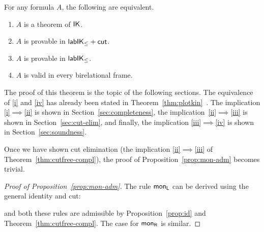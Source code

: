 \begin{theorem}\label{thm:cutfree-compl}
	For any formula $A$, the following are equivalent.
	\begin{enumerate}
		\item\label{i} $A$ is a theorem of $\mathsf{IK}$. 
		\item\label{ii} $A$ is provable in $\mathsf{lab}\mathsf{IK}_{\le} +\mathsf{cut}_{}$.
		\item\label{iii} $A$ is provable in $\mathsf{lab}\mathsf{IK}_{\le}$.
		\item\label{iv} $A$ is valid in every birelational frame. %
	\end{enumerate}
\end{theorem}

The proof of this theorem is the topic of the following sections. The
equivalence of \ref{i} and \ref{iv} has already been stated in
Theorem~\ref{thm:plotkin}~\cite{fischer-servi:84, plotkin:stirling:86}. The implication
\ref{i}$\implies$\ref{ii} is shown in Section~\ref{sec:completeness},
the implication~\ref{ii}$\implies$\ref{iii} is shown in
Section~\ref{sec:cut-elim}, and finally, the implication \ref{iii}$\implies$\ref{iv} is shown in Section~\ref{sec:soundness}.

Once we have shown cut elimination (the implication \ref{ii}$\implies$\ref{iii} of Theorem~\ref{thm:cutfree-compl}), the proof of Proposition~\ref{prop:mon-adm} becomes trivial.

\begin{proof}[Proof of Proposition~\ref{prop:mon-adm}]
  The rule $\mathsf{mon}_{\mathsf{L}}$ can be derived using the general identity and cut:
  \begin{smallequation*}
  \end{smallequation*}
  and both these rules are admissible by Proposition~\ref{prop:id} and
  Theorem~\ref{thm:cutfree-compl}. The case for $\mathsf{mon}_{\mathsf{R}}$ is
  similar.
\end{proof}
